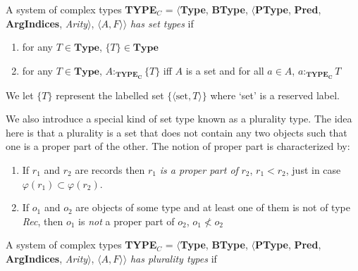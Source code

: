 A system of complex types {\bf TYPE$_C$} = $\langle${\bf Type}, {\bf BType},
$\langle$\textbf{PType}, {\bf Pred}, \textbf{ArgIndices}, {\it Arity\/}$\rangle$, $\langle A,F\rangle$$\rangle$ \textit{has set types} if
\begin{enumerate} 
 
\item for any $T \in \textbf{Type}$, $\{T\} \in \textbf{Type}$ 
 
\item for any $T \in \textbf{Type}$, 
$A:_{\mathbf{TYPE_C}}\{T\}$ iff  $A$ is a set and 
  for all $a\in A$, $a:_{\mathbf{TYPE_C}}T$
   
 
\end{enumerate}

We let $\{T\}$ represent the labelled set
$\{\langle\mathrm{set},T\rangle\}$ where `set' is a reserved
label.

We also introduce a special kind of set type known as a plurality
type.  The idea here is that a plurality is a set that does not contain any two
objects such that one is a proper part of the other.  The notion of
proper part is characterized by:
\begin{enumerate}
\item If $r_1$ and $r_2$ are records then $r_1$ \textit{is a proper
    part of} $r_2$, $r_1<r_2$, just in case $\varphi(r_1)\subset\varphi(r_2)$. 
 
\item If $o_1$ and $o_2$ are objects of some type and at least one of
  them is not of type \textit{Rec}, then $o_1$ is \textit{not} a
  proper part of $o_2$, $o_1\not<o_2$ 
\end{enumerate}

A system of complex types {\bf TYPE$_C$} = $\langle${\bf Type}, {\bf BType},
$\langle$\textbf{PType}, {\bf Pred}, \textbf{ArgIndices}, {\it Arity\/}$\rangle$, $\langle A,F\rangle$$\rangle$ \textit{has plurality types} if
  
